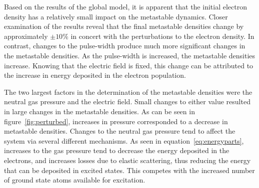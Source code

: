 Based on the results of the global model, it is apparent that the initial
electron density has a relatively small impact on the metastable dynamics.
Closer examination of the results reveal that the final metastable densities
change by approximately $\pm10\%$ in concert with the perturbations to the
electron density. In contrast, changes to the pulse-width produce much more
significant changes in the metastable densities. As the pulse-width is
increased, the metastable densities increase. Knowing that the electric field is
fixed, this change can be attributed to the increase in energy deposited in the
electron population.

The two largest factors in the determination of the metastable densities were
the neutral gas pressure and the electric field. Small changes to either value
resulted in large changes in the metastable densities. As can be seen in
figure~\ref{fig:perturbed}, increases in pressure corresponded to a decrease in
metastable densities. Changes to the neutral gas pressure tend to affect the
system via several different mechanisms. As seen in
equation~\ref{eq:energyparts}, increases to the gas pressure tend to decrease
the energy deposited in the electrons, and increases losses due to elastic
scattering, thus reducing the energy that can be deposited in excited states.
This competes with the increased number of ground state atoms available for
excitation.

